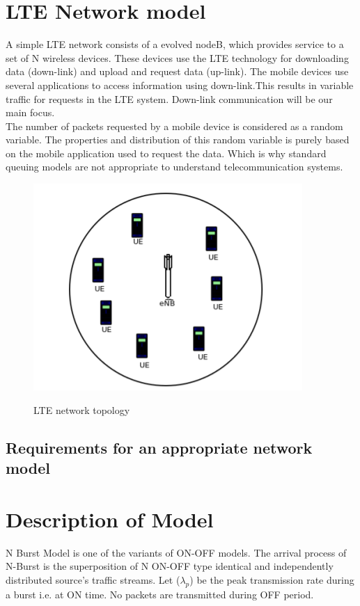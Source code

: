 \section{LTE Network model}
A simple LTE network consists of a evolved nodeB, which provides service to a set of N wireless devices. 
These devices use the LTE technology for downloading data (down-link) and  upload and request data (up-link).
The mobile devices use several applications to access information using down-link.This results in variable traffic for requests in the LTE system.
Down-link communication will be our main focus.
\\The number of packets requested by a mobile device is considered as a random variable.
The properties and distribution of this random variable is purely based on the mobile application used to request the data.
Which is why standard queuing models are not appropriate to understand telecommunication systems.\\
\begin{figure}[ht!]
        \centering
        \includegraphics[scale=1]{network.png}
        \\\caption{LTE network topology}
        \label{topology}
\end{figure}

\subsection{Requirements for an appropriate network model}
\section{Description of Model}

N Burst Model is one of the variants of ON-OFF models. The arrival process of N-Burst is the superposition of N ON-OFF type identical and independently distributed source’s traffic streams.
Let (${\lambda}_p$) be the peak transmission rate during a burst i.e. at ON time. No packets are transmitted during OFF period.\\


